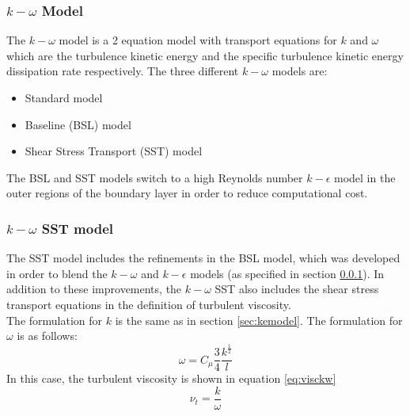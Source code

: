 \documentclass[11pt,a4paper,twoside,oneside]{article}
\begin{document}
\subsubsection{\texorpdfstring{$k-\omega$}{kw} Model}\label{sec:kwmodel}
The $k-\omega$ model is a 2 equation model with transport equations for $k$ and $\omega$ which are the turbulence kinetic energy and the specific turbulence kinetic energy dissipation rate respectively\cite{wilcox1998turbulence}\cite{wilcoxkw1}. The three different $k-\omega$ models are:
\begin{itemize}
    \item Standard model\cite{wilcox1998turbulence}
    \item Baseline (BSL) model\cite{mentersst}
    \item Shear Stress Transport (SST) model\cite{mentersst}\cite{mentersst2}
\end{itemize}
The BSL and SST models switch to a high Reynolds number $k-\epsilon$ model in the outer regions of the boundary layer in order to reduce computational cost.
\subsubsection{\texorpdfstring{$k-\omega$}{k-w} SST model}\label{sec:kwsst}
The SST model includes the refinements in the BSL model, which was developed in order to blend the $k-\omega$ and $k-\epsilon$ models (as specified in section \ref{sec:kwmodel}). In addition to these improvements, the $k-\omega$ SST also includes the shear stress transport equations in the definition of turbulent viscosity\cite{mentersst2}.\\
The formulation for $k$ is the same as in section \ref{sec:kemodel}. The formulation for $\omega$ is as follows:
$$
\omega=C_{\mu} \frac{3}{4} \frac{k^{\frac{1}{2}}}{l}
$$
In this case, the turbulent viscosity is shown in equation \ref{eq:visckw}
\begin{equation}\label{eq:visckw}
\nu_{t}=\frac{k}{\omega}
\end{equation}
\end{document}
